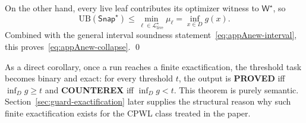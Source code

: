 On the other hand, every live leaf contributes its optimizer witness to $\mathsf W^\star$, so
\[
\mathrm{UB}(\mathsf{Snap}^\star)
\le
\min_{\ell\in \mathcal L_{\mathrm{live}}^\star} \mu_\ell
=
\inf_{x\in D} g(x).
\]
Combined with the general interval soundness statement~\eqref{eq:appAnew-interval}, this proves~\eqref{eq:appAnew-collapse}. \qed

As a direct corollary, once a run reaches a finite exactification, the threshold task becomes binary and exact: for every threshold $t$, the output is \textbf{PROVED} iff $\inf_D g\ge t$ and \textbf{COUNTEREX} iff $\inf_D g<t$. This theorem is purely semantic. Section~\ref{sec:guard-exactification} later supplies the structural reason why such finite exactification exists for the CPWL class treated in the paper.

